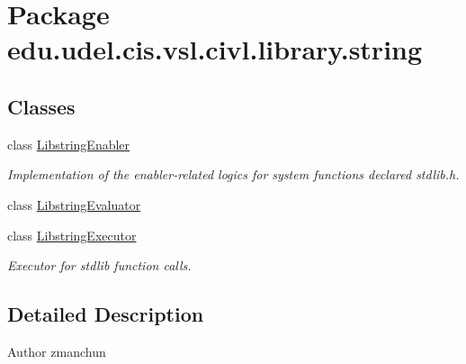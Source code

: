 \hypertarget{namespaceedu_1_1udel_1_1cis_1_1vsl_1_1civl_1_1library_1_1string}{}\section{Package edu.\+udel.\+cis.\+vsl.\+civl.\+library.\+string}
\label{namespaceedu_1_1udel_1_1cis_1_1vsl_1_1civl_1_1library_1_1string}
\subsection*{Classes}
\begin{DoxyCompactItemize}
\item 
class \hyperlink{classedu_1_1udel_1_1cis_1_1vsl_1_1civl_1_1library_1_1string_1_1LibstringEnabler}{Libstring\+Enabler}
\begin{DoxyCompactList}\small\item\em Implementation of the enabler-\/related logics for system functions declared stdlib.\+h. \end{DoxyCompactList}\item 
class \hyperlink{classedu_1_1udel_1_1cis_1_1vsl_1_1civl_1_1library_1_1string_1_1LibstringEvaluator}{Libstring\+Evaluator}
\item 
class \hyperlink{classedu_1_1udel_1_1cis_1_1vsl_1_1civl_1_1library_1_1string_1_1LibstringExecutor}{Libstring\+Executor}
\begin{DoxyCompactList}\small\item\em Executor for stdlib function calls. \end{DoxyCompactList}\end{DoxyCompactItemize}


\subsection{Detailed Description}
\begin{DoxyAuthor}{Author}
zmanchun 
\end{DoxyAuthor}
